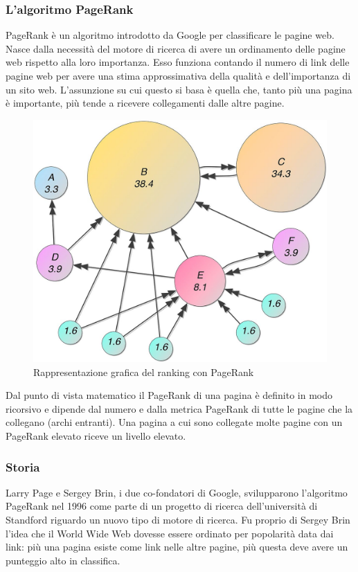 \documentclass[a4paper, 12pt]{article}
\begin{document}
\subsubsection{L'algoritmo PageRank}
PageRank \cite{Page98thepagerank} è un algoritmo introdotto da Google per classificare le pagine web. 
Nasce dalla necessità del motore di ricerca di avere un ordinamento delle pagine web rispetto alla loro importanza. Esso funziona contando il numero di link delle pagine web per avere una stima approssimativa della qualità e dell'importanza di un sito web. L'assunzione su cui questo si basa è quella che, tanto più una pagina è importante, più tende a ricevere collegamenti dalle altre pagine.
\begin{figure}[H]
  \includegraphics[width=\linewidth]{images/pagerank.jpg}
  \caption{Rappresentazione grafica del ranking con PageRank}
\end{figure}
Dal punto di vista matematico il PageRank di una pagina è definito in modo ricorsivo e dipende dal numero e dalla metrica PageRank di tutte le pagine che la collegano (archi entranti). Una pagina a cui sono collegate molte pagine con un PageRank elevato riceve un livello elevato.
\subsubsection{Storia}
Larry Page e Sergey Brin, i due co-fondatori di Google, svilupparono l'algoritmo PageRank nel 1996 come parte di un progetto di ricerca dell'università di Standford riguardo un nuovo tipo di motore di ricerca. Fu proprio di Sergey Brin l'idea che il World Wide Web dovesse essere ordinato per popolarità data dai link: più una pagina esiste come link nelle altre pagine, più questa deve avere un punteggio alto in classifica.
\end{document}
